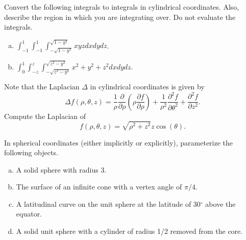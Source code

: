 \documentclass[12pt]{article} %
\begin{document}
\vspace*{.5cm}

\begin{problem}
    Convert the following integrals to integrals in cylindrical coordinates. Also, describe the region in which you are integrating over. Do not evaluate the integrals.
    \begin{enumerate}[(a)]
        \item $\displaystyle{\int_{-1}^{1} \int_{-1}^{1} \int_{-\sqrt{1-y^2}}^{\sqrt{1-y^2}} xyz dxdydz}$.
        \item $\displaystyle{\int_0^1 \int_{-z}^z \int_{-\sqrt{z^2-y^2}}^{\sqrt{z^2-y^2}} x^2+y^2+z^2 dxdydz}$.
    \end{enumerate}
\end{problem}

\vspace*{.5cm}

\begin{problem}
    Note that the Laplacian $\Delta$ in cylindrical coordinates is given by
    \[
        \Delta f(\rho,\theta,z) = \frac{1}{\rho} \frac{\partial}{\partial \rho} \left(\rho \frac{\partial f}{\partial \rho}\right)+\frac{1}{\rho^2}\frac{\partial^2 f}{\partial \theta^2} + \frac{\partial^2 f}{\partial z^2}.
    \]
    Compute the Laplacian of
    \[
        f(\rho,\theta,z) = \sqrt{\rho^2+z^2} z \cos(\theta).
    \]
\end{problem}

\begin{problem}
	In spherical coordinates (either implicitly or explicitly), parameterize the following objects.
	\begin{enumerate}[(a)]
		\item A solid sphere with radius 3.
		\item The surface of an infinite cone with a vertex angle of $\pi/4$.
		\item A latitudinal curve on the unit sphere at the latitude of 30$^\circ$ above the equator.
		\item A solid unit sphere with a cylinder of radius 1/2 removed from the core.
	\end{enumerate}
\end{problem}

\vspace*{.5cm}
\end{document}
